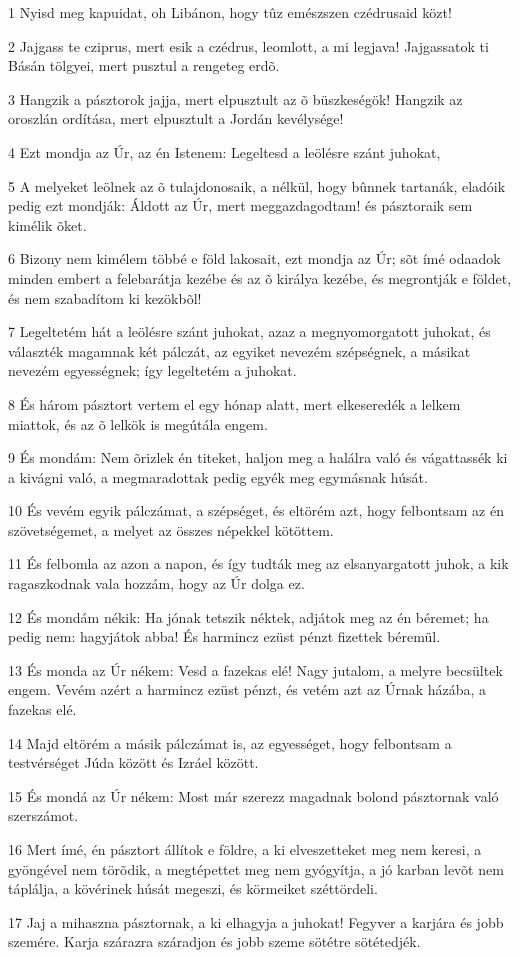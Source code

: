 \par 1 Nyisd meg kapuidat, oh Libánon, hogy tûz emészszen czédrusaid közt!
\par 2 Jajgass te cziprus, mert esik a czédrus, leomlott, a mi legjava! Jajgassatok ti Básán tölgyei, mert pusztul a rengeteg erdõ.
\par 3 Hangzik a pásztorok jajja, mert elpusztult az õ büszkeségök! Hangzik az oroszlán ordítása, mert elpusztult a Jordán kevélysége!
\par 4 Ezt mondja az Úr, az én Istenem: Legeltesd a leölésre szánt juhokat,
\par 5 A melyeket leölnek az õ tulajdonosaik, a nélkül, hogy bûnnek tartanák, eladóik pedig ezt mondják: Áldott az Úr, mert meggazdagodtam! és pásztoraik sem kimélik õket.
\par 6 Bizony nem kimélem többé e föld lakosait, ezt mondja az Úr; sõt ímé odaadok minden embert a felebarátja kezébe és az õ királya kezébe, és megrontják e földet, és nem szabadítom ki kezökbõl!
\par 7 Legeltetém hát a leölésre szánt juhokat, azaz a megnyomorgatott juhokat, és választék magamnak két pálczát, az egyiket nevezém szépségnek, a másikat nevezém egyességnek; így legeltetém a juhokat.
\par 8 És három pásztort vertem el egy hónap alatt, mert elkeseredék a lelkem miattok, és az õ lelkök is megútála engem.
\par 9 És mondám: Nem õrizlek én titeket, haljon meg a halálra való és vágattassék ki a kivágni való, a megmaradottak pedig egyék meg egymásnak húsát.
\par 10 És vevém egyik pálczámat, a szépséget, és eltörém azt, hogy felbontsam az én szövetségemet, a melyet az összes népekkel kötöttem.
\par 11 És felbomla az azon a napon, és így tudták meg az elsanyargatott juhok, a kik ragaszkodnak vala hozzám, hogy az Úr dolga ez.
\par 12 És mondám nékik: Ha jónak tetszik néktek, adjátok meg az én béremet; ha pedig nem: hagyjátok abba! És harmincz ezüst pénzt fizettek béremül.
\par 13 És monda az Úr nékem: Vesd a fazekas elé! Nagy jutalom, a melyre becsültek engem. Vevém azért a harmincz ezüst pénzt, és vetém azt az Úrnak házába, a fazekas elé.
\par 14 Majd eltörém a másik pálczámat is, az egyességet, hogy felbontsam a testvérséget Júda között és Izráel között.
\par 15 És mondá az Úr nékem: Most már szerezz magadnak bolond pásztornak való szerszámot.
\par 16 Mert ímé, én pásztort állítok e földre, a ki elveszetteket meg nem keresi, a gyöngével nem törõdik, a megtépettet meg nem gyógyítja, a jó karban levõt nem táplálja, a kövérinek húsát megeszi, és körmeiket széttördeli.
\par 17 Jaj a mihaszna pásztornak, a ki elhagyja a juhokat! Fegyver a karjára és jobb szemére. Karja szárazra száradjon és jobb szeme sötétre sötétedjék.

